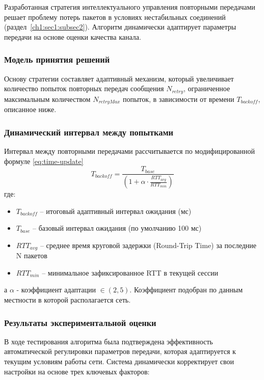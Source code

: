 Разработанная стратегия интеллектуального управления повторными передачами решает проблему потерь пакетов в условиях нестабильных соединений (раздел~\ref{ch1:sec1:subsec2}). Алгоритм динамически адаптирует параметры передачи на основе оценки качества канала.

\subsubsection{Модель принятия решений}
Основу стратегии составляет адаптивный механизм, который увеличивает количество попыток повторных передач сообщения $N_{retry}$, 
ограниченное максимальным количеством $N_{retryMax}$ попыток, в зависимости от времени $T_{backoff}$, описанное ниже.

\subsubsection{Динамический интервал между попытками}
Интервал между повторными передачами рассчитывается по модифицированной формуле \ref{eq:time-update} \cite{clausen2003olsr}
\begin{equation}
T_{backoff} = \frac{T_{base}}{\left(1 + \alpha \cdot \frac{RTT_{avg}}{RTT_{min}}\right)}
\end{equation}
где:
\begin{itemize}
    \item $T_{backoff}$ -- итоговый адаптивный интервал ожидания (мс)
    \item $T_{base}$ -- базовый интервал ожидания (по умолчанию 100 мс)
    \item $RTT_{avg}$ -- среднее время круговой задержки (Round-Trip Time) за последние N пакетов
    \item $RTT_{min}$ -- минимальное зафиксированное RTT в текущей сессии
\end{itemize}
а $\alpha$ - коэффициент адаптации $\in (2,5)$.
Коэффициент подобран по данным местности в которой располагается сеть.

\subsubsection{Результаты экспериментальной оценки}

В ходе тестирования алгоритма была подтверждена эффективность автоматической регулировки параметров передачи, которая адаптируется к 
текущим условиям работы сети. Система динамически корректирует свои настройки на основе трех ключевых факторов:

